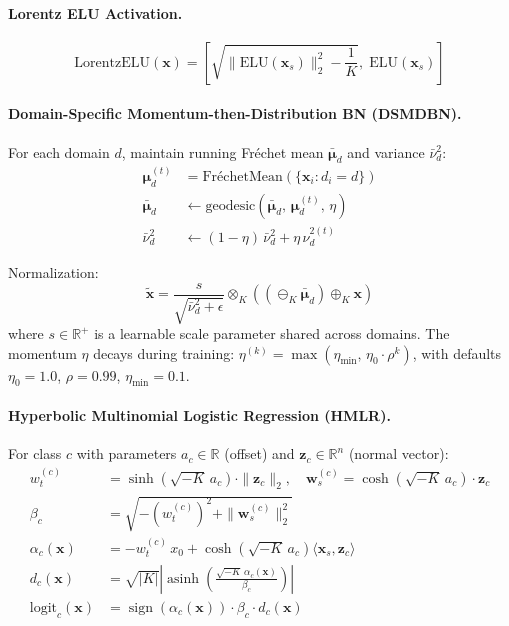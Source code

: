 \documentclass{article}
\DeclareMathOperator{\asinh}{asinh}
\DeclareMathOperator{\sign}{sign}
\newcommand{\R}{\mathbb{R}}
\newcommand{\bx}{\bm{x}}
\newcommand{\bz}{\bm{z}}
\newcommand{\bmu}{\bm{\mu}}
\newcommand{\inner}[2]{\langle #1, #2 \rangle}
\begin{document}
\paragraph{Lorentz ELU Activation.}
\begin{equation}
\text{LorentzELU}(\bx) = \left[\sqrt{\|\text{ELU}(\bx_s)\|_2^2 - \frac{1}{K}},\; \text{ELU}(\bx_s)\right]
\end{equation}

\paragraph{Domain-Specific Momentum-then-Distribution BN (DSMDBN).}
For each domain $d$, maintain running Fr\'{e}chet mean $\bar{\bmu}_d$ and variance $\bar{\nu}^2_d$:
\begin{align}
\bmu_d^{(t)} &= \text{Fr\'{e}chetMean}\!\left(\{\bx_i : d_i = d\}\right) \\
\bar{\bmu}_d &\leftarrow \text{geodesic}\!\left(\bar{\bmu}_d,\, \bmu_d^{(t)},\, \eta\right) \\
\bar{\nu}^2_d &\leftarrow (1 - \eta)\, \bar{\nu}^2_d + \eta\, \nu^{2(t)}_d
\end{align}

Normalization:
\begin{equation}
\tilde{\bx} = \frac{s}{\sqrt{\bar{\nu}^2_d + \epsilon}} \otimes_K \left((\ominus_K \bar{\bmu}_d) \oplus_K \bx\right)
\end{equation}
where $s \in \R^+$ is a learnable scale parameter shared across domains.
The momentum $\eta$ decays during training: $\eta^{(k)} = \max(\eta_\text{min},\, \eta_0 \cdot \rho^k)$, with defaults $\eta_0 = 1.0$, $\rho = 0.99$, $\eta_\text{min} = 0.1$.

\paragraph{Hyperbolic Multinomial Logistic Regression (HMLR).}
For class $c$ with parameters $a_c \in \R$ (offset) and $\bz_c \in \R^{n}$ (normal vector):
\begin{align}
w_t^{(c)} &= \sinh(\sqrt{-K}\, a_c) \cdot \|\bz_c\|_2, \quad
\bm{w}_s^{(c)} = \cosh(\sqrt{-K}\, a_c) \cdot \bz_c \\
\beta_c &= \sqrt{-\left(w_t^{(c)}\right)^2 + \|\bm{w}_s^{(c)}\|_2^2} \\
\alpha_c(\bx) &= -w_t^{(c)}\, x_0 + \cosh(\sqrt{-K}\, a_c) \inner{\bx_s}{\bz_c} \\
d_c(\bx) &= \sqrt{|K|} \left| \asinh\!\left(\frac{\sqrt{-K}\, \alpha_c(\bx)}{\beta_c}\right) \right| \\
\text{logit}_c(\bx) &= \sign(\alpha_c(\bx)) \cdot \beta_c \cdot d_c(\bx)
\end{align}
\end{document}
